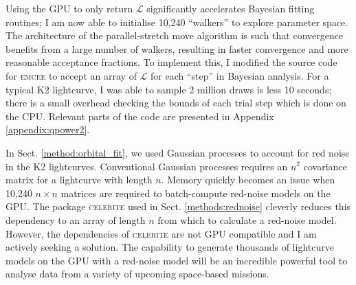 Using the GPU to only return $\mathcal{L}$ significantly accelerates Bayesian fitting routines; I am now able to initialise 10,240 ``walkers'' to explore parameter space. The architecture of the parallel-stretch move algorithm is such that convergence benefits from a large number of walkers, resulting in faster convergence and more reasonable acceptance fractions. To implement this, I modified the source code for \textsc{emcee} to accept an array of $\mathcal{L}$ for each ``step'' in Bayesian analysis. For a typical K2 lightcurve, I was able to sample 2 million draws is less 10 seconds; there is a small overhead checking the bounds of each trial step which is done on the CPU. Relevant parts of the code are presented in Appendix \ref{appendix:qpower2}.

In Sect. \ref{method:orbital_fit}, we used Gaussian processes to account for red noise in the K2 lightcurves. Conventional Gaussian processes requires an $n^2$ covariance matrix for a lightcurve with length $n$. Memory quickly becomes an issue when 10,240 $n \times n$ matrices are required to batch-compute red-noise models on the GPU. The package \textsc{celerite} used in Sect. \ref{methods:rednoise} cleverly reduces this dependency to an array of length $n$ from which to calculate a red-noise model. However, the dependencies of \textsc{celerite} are not GPU compatible and I am actively seeking a solution. The capability to generate thousands of lightcurve models on the GPU with a red-noise model will be an incredible powerful tool to analyse data from a variety of upcoming space-based missions. 
